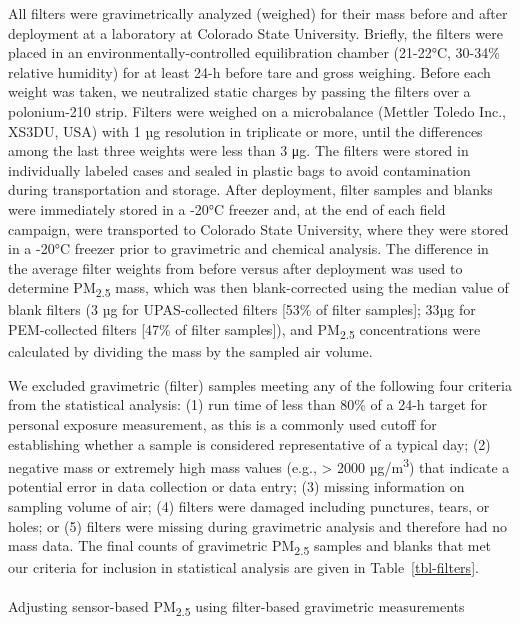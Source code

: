 \documentclass[
  letterpaper,
  DIV=11,
  numbers=noendperiod]{scrartcl}
\makeatletter
\let\oldparagraph\paragraph
\renewcommand{\paragraph}{
    \@ifstar
      \xxxParagraphStar
      \xxxParagraphNoStar
  }
\newcommand{\xxxParagraphStar}[1]{\oldparagraph*{#1}\mbox{}}
\newcommand{\xxxParagraphNoStar}[1]{\oldparagraph{#1}\mbox{}}
\makeatother
\begin{document}
All filters were gravimetrically analyzed (weighed) for their mass
before and after deployment at a laboratory at Colorado State
University. Briefly, the filters were placed in an
environmentally-controlled equilibration chamber (21-22°C, 30-34\%
relative humidity) for at least 24-h before tare and gross weighing.
Before each weight was taken, we neutralized static charges by passing
the filters over a polonium-210 strip. Filters were weighed on a
microbalance (Mettler Toledo Inc., XS3DU, USA) with 1 µg resolution in
triplicate or more, until the differences among the last three weights
were less than 3 μg. The filters were stored in individually labeled
cases and sealed in plastic bags to avoid contamination during
transportation and storage. After deployment, filter samples and blanks
were immediately stored in a -20°C freezer and, at the end of each field
campaign, were transported to Colorado State University, where they were
stored in a -20°C freezer prior to gravimetric and chemical analysis.
The difference in the average filter weights from before versus after
deployment was used to determine PM\textsubscript{2.5} mass, which was
then blank-corrected using the median value of blank filters (3 µg for
UPAS-collected filters {[}53\% of filter samples{]}; 33µg for
PEM-collected filters {[}47\% of filter samples{]}), and
PM\textsubscript{2.5} concentrations were calculated by dividing the
mass by the sampled air volume.

We  excluded gravimetric (filter) samples meeting any of
the following four criteria from the statistical analysis: (1) run time
of less than 80\% of a 24-h target for personal exposure measurement, as
this is a commonly used cutoff for establishing whether a sample is
considered representative of a typical day; (2) negative mass or
extremely high mass values (e.g., \textgreater{} 2000
µg/m\textsuperscript{3}) that indicate a potential error in data
collection or data entry; (3) missing information on sampling volume of
air; (4) filters were damaged including punctures, tears, or holes; or
(5) filters were missing during gravimetric analysis and therefore had
no mass data. The final counts of gravimetric PM\textsubscript{2.5}
samples and blanks that met our criteria for inclusion in statistical
analysis are given in Table~\ref{tbl-filters}.

\paragraph{\texorpdfstring{Adjusting sensor-based PM\textsubscript{2.5}
using filter-based gravimetric
measurements}{Adjusting sensor-based PM2.5 using filter-based gravimetric measurements}}\label{adjusting-sensor-based-pm2.5-using-filter-based-gravimetric-measurements}
\end{document}
